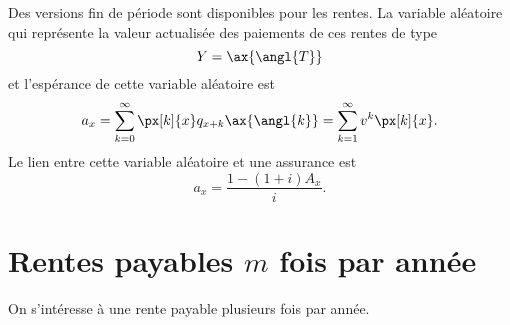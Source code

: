 Des versions fin de période sont disponibles pour les rentes. La variable aléatoire qui représente la valeur actualisée des paiements de ces rentes de type
$$ Y = \ax{\angl{T}}$$
et l'espérance de cette variable aléatoire est 
$$a_x = \sum_{k = 0}^{\infty} \px[k]{x} q_{x + k} \ax{\angl{k}} = \sum_{k = 1}^{\infty} v^k \px[k]{x}.$$
Le lien entre cette variable aléatoire et une assurance est 
$$a_x = \frac{1 - (1 + i)A_x}{i}.$$

\section{Rentes payables $m$ fois par année}

On s'intéresse à une rente payable plusieurs fois par année. 




























